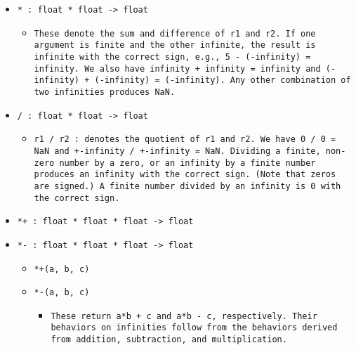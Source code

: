 \documentclass[11pt]{report}
\begin{document}
\begin{itemize}
\begin{itemize}
\begin{itemize}
\end{itemize}
\coqdocemptyline
\coqdocemptyline

\item  \texttt{* : float * float -> float}

\begin{itemize}
\item  \begin{flushleft} \texttt{These denote the sum and difference of r1 and r2. If one argument is finite and the other infinite, the result is infinite with the correct sign, e.g., 5 - (-infinity) = infinity. We also have infinity + infinity = infinity and (-infinity) + (-infinity) = (-infinity). Any other combination of two infinities produces NaN.} \end{flushleft}
\end{itemize}
\coqdocemptyline
\coqdocemptyline

\item  \texttt{/ : float * float -> float}

\begin{itemize}
\item   \begin{flushleft} \texttt{r1 / r2 : denotes the quotient of r1 and r2. We have 0 / 0 = NaN and +-infinity / +-infinity = NaN. Dividing a finite, non-zero number by a zero, or an infinity by a finite number produces an infinity with the correct sign. (Note that zeros are signed.) A finite number divided by an infinity is 0 with the correct sign.} \end{flushleft}
\end{itemize}
\coqdocemptyline
\coqdocemptyline

\item  \texttt{*+ : float * float * float -> float}

\item  \texttt{*- : float * float * float -> float}

\begin{itemize}
\item \texttt{*+(a, b, c)} 
\item \texttt{*-(a, b, c)}

\begin{itemize}
\item \begin{flushleft} \texttt{These return a*b + c and a*b - c, respectively. Their behaviors on infinities follow from the behaviors derived from addition, subtraction, and multiplication.} \end{flushleft}
\end{itemize}


\end{itemize}
\end{itemize}
\end{itemize}
\end{document}
